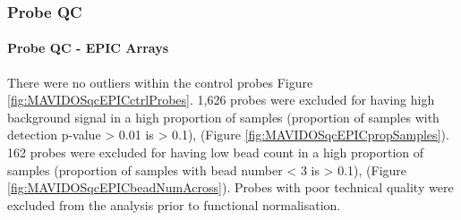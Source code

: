 \documentclass[
]{book}
\begin{document}
\hypertarget{probe-qc}{%
\subsubsection{Probe QC}\label{probe-qc}}

\hypertarget{probe-qc---epic-arrays}{%
\paragraph{Probe QC - EPIC Arrays}\label{probe-qc---epic-arrays}}

There were no outliers within the control probes Figure \ref{fig:MAVIDOSqcEPICctrlProbes}.
1,626 probes were excluded for having high background signal in a high proportion of samples (proportion of samples with detection p-value \textgreater{} 0.01 is \textgreater{} 0.1), (Figure \ref{fig:MAVIDOSqcEPICpropSamples}).
162 probes were excluded for having low bead count in a high proportion of samples (proportion of samples with bead number \textless{} 3 is \textgreater{} 0.1), (Figure \ref{fig:MAVIDOSqcEPICbeadNumAcross}).
Probes with poor technical quality were excluded from the analysis prior to functional normalisation.
\end{document}
